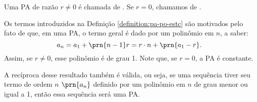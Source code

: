 \begin{definition}
\label{definition:pa-po-estc}
Uma PA de razão $r \ne 0$ é chamada de . Se $r=0$, chamamos de .
\end{definition}

\begin{remark}
Os termos introduzidos na Definição \ref{definition:pa-po-estc} são motivados pelo fato de que, em uma PA, o termo geral é dado por um polinômio em $n$, a saber:
%
\begin{equation*}
a_n = a_1 + \prn{n-1} r = r \cdot n + \prn{a_1 - r}.
\end{equation*}
%
\noindent Assim, se $r\ne 0$, esse polinômio é de grau 1. Note que, se $r=0$, a PA é constante.

A recíproca desse resultado também é válida, ou seja, se uma sequência tiver seu termo de ordem $n$ $\prn{a_n}$ definido por um
polinômio em $n$ de grau menor ou igual a 1, então essa sequência será uma PA.
\end{remark}